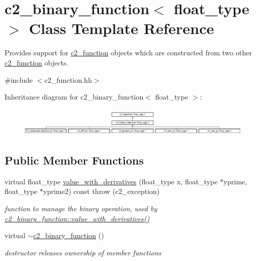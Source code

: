 \hypertarget{classc2__binary__function}{\section{c2\-\_\-binary\-\_\-function$<$ float\-\_\-type $>$ Class Template Reference}
\label{classc2__binary__function}
}


Provides support for \hyperlink{classc2__function}{c2\-\_\-function} objects which are constructed from two other \hyperlink{classc2__function}{c2\-\_\-function} objects.  




{\ttfamily \#include $<$c2\-\_\-function.\-hh$>$}

Inheritance diagram for c2\-\_\-binary\-\_\-function$<$ float\-\_\-type $>$\-:\begin{figure}[H]
\begin{center}
\leavevmode
\includegraphics[height=1.382716cm]{classc2__binary__function}
\end{center}
\end{figure}
\subsection*{Public Member Functions}
\begin{DoxyCompactItemize}
\item 
\hypertarget{classc2__binary__function_a7ab60d022222ce65e99f8708bf2aae0d}{virtual float\-\_\-type \hyperlink{classc2__binary__function_a7ab60d022222ce65e99f8708bf2aae0d}{value\-\_\-with\-\_\-derivatives} (float\-\_\-type x, float\-\_\-type $\ast$yprime, float\-\_\-type $\ast$yprime2) const   throw (c2\-\_\-exception)}\label{classc2__binary__function_a7ab60d022222ce65e99f8708bf2aae0d}

\begin{DoxyCompactList}\small\item\em function to manage the binary operation, used by \hyperlink{classc2__binary__function_a7ab60d022222ce65e99f8708bf2aae0d}{c2\-\_\-binary\-\_\-function\-::value\-\_\-with\-\_\-derivatives()} \end{DoxyCompactList}\item 
\hypertarget{classc2__binary__function_aaec2d1f2a53845f36974b0b82786d4f2}{virtual \hyperlink{classc2__binary__function_aaec2d1f2a53845f36974b0b82786d4f2}{$\sim$c2\-\_\-binary\-\_\-function} ()}\label{classc2__binary__function_aaec2d1f2a53845f36974b0b82786d4f2}

\begin{DoxyCompactList}\small\item\em destructor releases ownership of member functions \end{DoxyCompactList}\end{DoxyCompactItemize}
